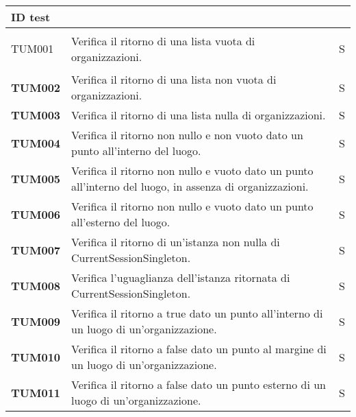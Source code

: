 \documentclass[../../piano-di-qualifica.tex]{subfiles}
\begin{document}
\renewcommand{\arraystretch}{2}
\begin{longtable}[H]{>{\centering\bfseries}m{3cm} >{}m{10cm} >{\centering\arraybackslash}m{3cm}}
  \rowcolor{darkgray!90!}
  \color{white}
  {\textbf{ID test}} & \color{white}{\textbf{Metodo}}                                    & \color{white}{\textbf{Esito}} \\
  \endhead\rowcolor{white}%
  \multicolumn{3}{r}{\textit{Continua alla pagina seguente}}
  \endfoot%
  \endlastfoot%



  TUM001             & Verifica il ritorno di una lista vuota di organizzazioni. & S\\

  TUM002             & Verifica il ritorno di una lista non vuota di organizzazioni. & S\\

  TUM003             & Verifica il ritorno di una lista nulla di organizzazioni. & S\\

  TUM004             & Verifica il ritorno non nullo e non vuoto dato un punto all'interno del luogo. & S\\

  TUM005             & Verifica il ritorno non nullo e vuoto dato un punto all'interno del luogo, in assenza di organizzazioni. & S\\

  TUM006             & Verifica il ritorno non nullo e vuoto dato un punto all'esterno del luogo. & S\\

  TUM007             & Verifica il ritorno di un'istanza non nulla di CurrentSessionSingleton. & S\\

  TUM008             & Verifica l'uguaglianza dell'istanza ritornata di CurrentSessionSingleton. & S\\

  TUM009             & Verifica il ritorno a true dato un punto all'interno di un luogo di un'organizzazione. & S\\

  TUM010             & Verifica il ritorno a false dato un punto al margine di un luogo di un'organizzazione. & S\\

  TUM011             & Verifica il ritorno a false dato un punto esterno di un luogo di un'organizzazione. & S\\


\end{longtable}
\end{document}

